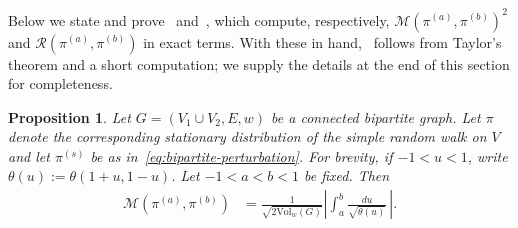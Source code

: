 \documentclass[11pt,a4paper]{article}
\newcommand{\Maas}{\mathcal{M}}
\newcommand{\Resis}{\mathcal{R}}
\newcommand{\Vol}{\mathrm{Vol}}
\newtheorem{proposition}[theorem]{Proposition}
\begin{document}
Below we state and prove~ and~, which compute, respectively, $\Maas(\pi^{(a)},\pi^{(b)})^2$ and $\Resis(\pi^{(a)},\pi^{(b)})$ in exact terms. With these in hand,~ follows from Taylor's theorem and a short computation; we supply the details at the end of this section for completeness.

\begin{proposition}\label{prop:bipartite-explicit}
    Let $G=(V_1\cup V_2, E, w)$ be a connected bipartite graph. Let $\pi$ denote the corresponding stationary distribution of the simple random walk on $V$ and let $\pi^{(s)}$ be as in~\cref{eq:bipartite-perturbation}. For brevity, if $-1 < u <1$, write $\theta(u) := \theta(1+u, 1-u)$. Let $-1 < a < b < 1$ be fixed. Then
        \begin{align}\label{eq:bipartite-maas}
            \Maas(\pi^{(a)},\pi^{(b)}) &= \frac{1}{\sqrt{2\Vol_w(G)}} \left| \int_a^{b} \frac{du}{\sqrt{\theta(u)}}\,\right|.
        \end{align}
\end{proposition}
\end{document}
